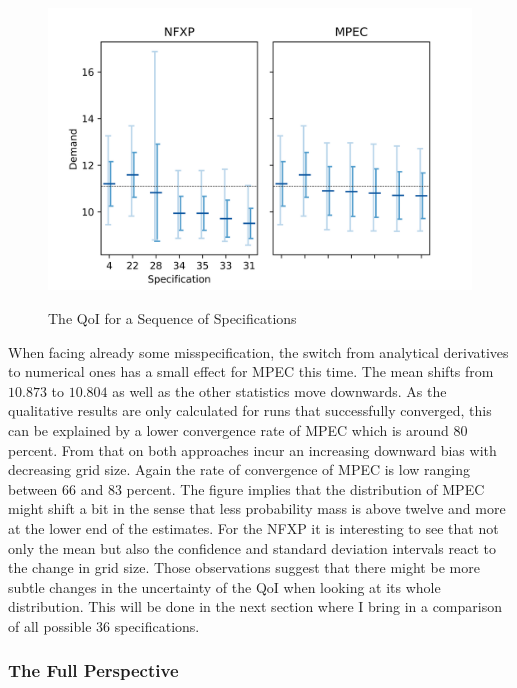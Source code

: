 \begin{figure}[!t]
	\caption{The QoI for a Sequence of Specifications}
	\vspace*{-4mm}
	\centering
	\includegraphics[scale=0.9]{../figures/figure_9.png}
	\label{figure9}
\end{figure}

When facing already some misspecification, the switch from analytical derivatives to numerical ones has a small effect for MPEC this time. The mean shifts from $10.873$ to $10.804$ as well as the other statistics move downwards. As the qualitative results are only calculated for runs that successfully converged, this can be explained by a lower convergence rate of MPEC which is around 80 percent. From that on both approaches incur an increasing downward bias with decreasing grid size. Again the rate of convergence of MPEC is low ranging between 66 and 83 percent. The figure implies that the distribution of MPEC might shift a bit in the sense that less probability mass is above twelve and more at the lower end of the estimates. For the NFXP it is interesting to see that not only the mean but also the confidence and standard deviation intervals react to the change in grid size. Those observations suggest that there might be more subtle changes in the uncertainty of the QoI when looking at its whole distribution. This will be done in the next section where I bring in a comparison of all possible 36 specifications.

\subsubsection{The Full Perspective}

